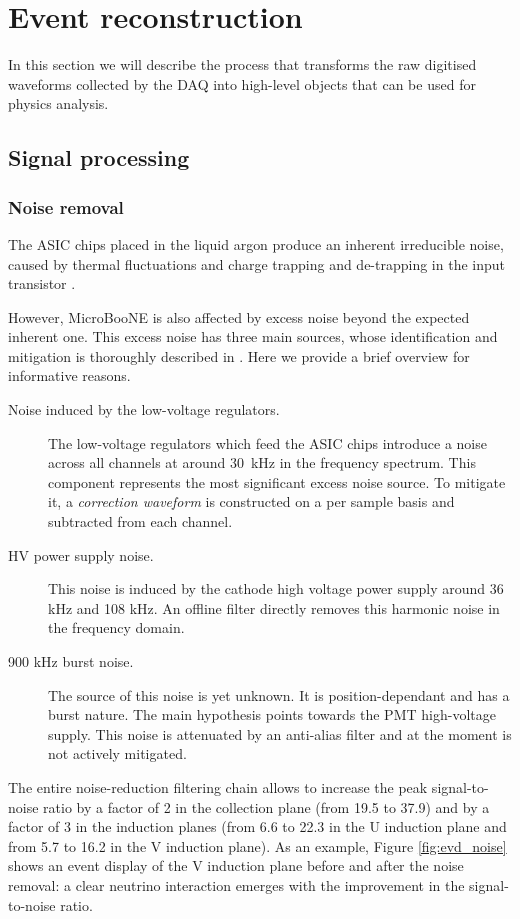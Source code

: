 \chapter{Event reconstruction}\label{sec:eventreco}

\minitoc

In this section we will describe the process that transforms the raw digitised waveforms collected by the DAQ into high-level objects that can be used for physics analysis. 

\section{Signal processing}
\subsection{Noise removal}
The ASIC chips placed in the liquid argon produce an inherent irreducible noise, caused by thermal fluctuations and charge trapping and de-trapping in the input transistor \cite{Acciarri:2017sde}. 

However, MicroBooNE is also affected by excess noise beyond the expected inherent one. This excess noise has three main sources, whose identification and mitigation is thoroughly described in \cite{Acciarri:2017sde}. Here we provide a brief overview for informative reasons.
\begin{description}
\item[Noise induced by the low-voltage regulators.] The low-voltage regulators which feed the ASIC chips introduce a noise across all channels at around 30~kHz in the frequency spectrum. This component represents the most significant excess noise source. To mitigate it, a \emph{correction waveform} is constructed on a per sample basis and subtracted from each channel.
\item[HV power supply noise.] This noise is induced by the cathode high voltage power supply around 36 kHz and 108 kHz. An offline filter directly removes this harmonic noise in the frequency domain.
\item[900 kHz burst noise.] The source of this noise is yet unknown. It is position-dependant and has a burst nature. The main hypothesis points towards the PMT high-voltage supply. This noise is attenuated by an anti-alias filter and at the moment is not actively mitigated.
\end{description}
The entire noise-reduction filtering chain allows to increase the peak signal-to-noise ratio by a factor of 2 in the collection plane (from 19.5 to 37.9) and by a factor of 3 in the induction planes (from 6.6 to 22.3 in the U induction plane and from 5.7 to 16.2 in the V induction plane). As an example, Figure \ref{fig:evd_noise} shows an event display of the V induction plane before and after the noise removal: a clear neutrino interaction emerges with the improvement in the signal-to-noise ratio. 

